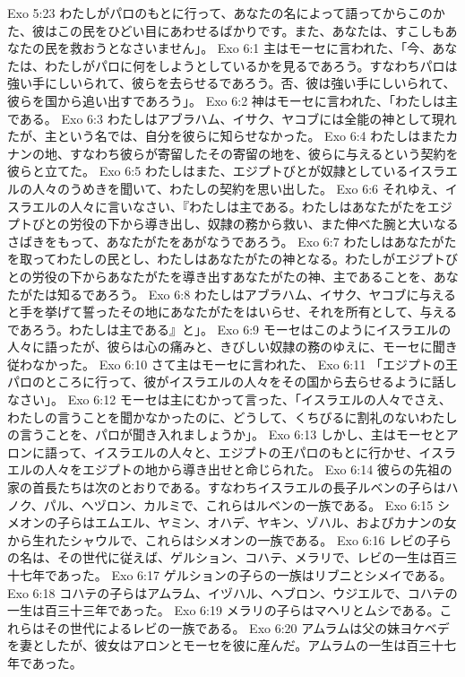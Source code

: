 Exo 5:23  わたしがパロのもとに行って、あなたの名によって語ってからこのかた、彼はこの民をひどい目にあわせるばかりです。また、あなたは、すこしもあなたの民を救おうとなさいません」。
Exo 6:1  主はモーセに言われた、「今、あなたは、わたしがパロに何をしようとしているかを見るであろう。すなわちパロは強い手にしいられて、彼らを去らせるであろう。否、彼は強い手にしいられて、彼らを国から追い出すであろう」。
Exo 6:2  神はモーセに言われた、「わたしは主である。
Exo 6:3  わたしはアブラハム、イサク、ヤコブには全能の神として現れたが、主という名では、自分を彼らに知らせなかった。
Exo 6:4  わたしはまたカナンの地、すなわち彼らが寄留したその寄留の地を、彼らに与えるという契約を彼らと立てた。
Exo 6:5  わたしはまた、エジプトびとが奴隷としているイスラエルの人々のうめきを聞いて、わたしの契約を思い出した。
Exo 6:6  それゆえ、イスラエルの人々に言いなさい、『わたしは主である。わたしはあなたがたをエジプトびとの労役の下から導き出し、奴隷の務から救い、また伸べた腕と大いなるさばきをもって、あなたがたをあがなうであろう。
Exo 6:7  わたしはあなたがたを取ってわたしの民とし、わたしはあなたがたの神となる。わたしがエジプトびとの労役の下からあなたがたを導き出すあなたがたの神、主であることを、あなたがたは知るであろう。
Exo 6:8  わたしはアブラハム、イサク、ヤコブに与えると手を挙げて誓ったその地にあなたがたをはいらせ、それを所有として、与えるであろう。わたしは主である』と」。
Exo 6:9  モーセはこのようにイスラエルの人々に語ったが、彼らは心の痛みと、きびしい奴隷の務のゆえに、モーセに聞き従わなかった。
Exo 6:10  さて主はモーセに言われた、
Exo 6:11  「エジプトの王パロのところに行って、彼がイスラエルの人々をその国から去らせるように話しなさい」。
Exo 6:12  モーセは主にむかって言った、「イスラエルの人々でさえ、わたしの言うことを聞かなかったのに、どうして、くちびるに割礼のないわたしの言うことを、パロが聞き入れましょうか」。
Exo 6:13  しかし、主はモーセとアロンに語って、イスラエルの人々と、エジプトの王パロのもとに行かせ、イスラエルの人々をエジプトの地から導き出せと命じられた。
Exo 6:14  彼らの先祖の家の首長たちは次のとおりである。すなわちイスラエルの長子ルベンの子らはハノク、パル、ヘヅロン、カルミで、これらはルベンの一族である。
Exo 6:15  シメオンの子らはエムエル、ヤミン、オハデ、ヤキン、ゾハル、およびカナンの女から生れたシャウルで、これらはシメオンの一族である。
Exo 6:16  レビの子らの名は、その世代に従えば、ゲルション、コハテ、メラリで、レビの一生は百三十七年であった。
Exo 6:17  ゲルションの子らの一族はリブニとシメイである。
Exo 6:18  コハテの子らはアムラム、イヅハル、ヘブロン、ウジエルで、コハテの一生は百三十三年であった。
Exo 6:19  メラリの子らはマヘリとムシである。これらはその世代によるレビの一族である。
Exo 6:20  アムラムは父の妹ヨケベデを妻としたが、彼女はアロンとモーセを彼に産んだ。アムラムの一生は百三十七年であった。
